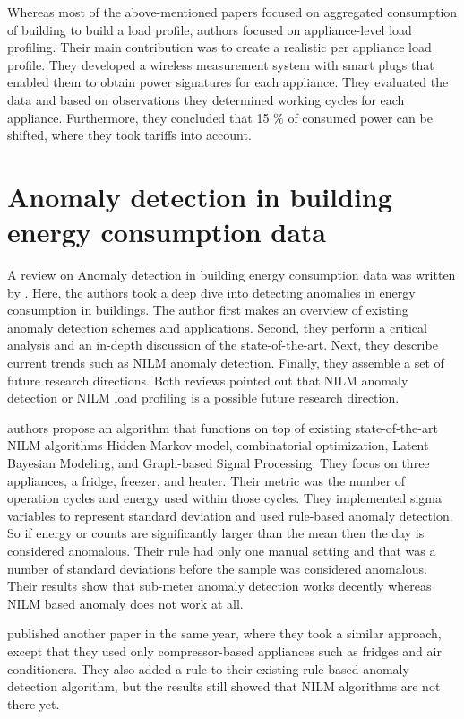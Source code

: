 Whereas most of the above-mentioned papers focused on aggregated consumption of building to build a load profile,
authors \cite{Issi2018} focused on appliance-level load profiling.
Their main contribution was to create a realistic per appliance load profile.
They developed a wireless measurement system with smart plugs that enabled them to obtain 
power signatures for each appliance. They evaluated the data and based on observations they determined working cycles for each appliance.
Furthermore, they concluded that 15 \% of consumed power can be shifted, where they took tariffs into account. 

\section{Anomaly detection in building energy consumption data}

A review on Anomaly detection in building energy consumption data was written by \cite{HIMEUR2021116601}.
Here, the authors took a deep dive into detecting anomalies in energy consumption in buildings. 
The author first makes an overview of existing anomaly detection schemes and applications.
Second, they perform a critical analysis and an in-depth discussion of the state-of-the-art.
Next, they describe current trends such as NILM anomaly detection. Finally, they assemble a set of future research directions. 
Both reviews pointed out that NILM anomaly detection or NILM load profiling is a possible future research direction.

\cite{NILMAD2019} authors propose an algorithm
that functions on top of existing state-of-the-art NILM algorithms Hidden Markov model,
combinatorial optimization, Latent Bayesian Modeling, and Graph-based Signal Processing.
They focus on three appliances, a fridge, freezer, and heater. Their metric was the number of operation cycles and energy used within those cycles. 
They implemented sigma variables to represent standard deviation and used rule-based anomaly detection.
So if energy or counts are significantly larger than the mean then the day is considered anomalous.
Their rule had only one manual setting and that was a number of standard deviations before the sample was considered anomalous.
Their results show that sub-meter anomaly detection works decently whereas NILM based anomaly does not work at all. 

\cite{NILMAD22019} published another paper in the same year, where they took a similar approach, except that they used 
only compressor-based appliances such as fridges and air conditioners. They also added a rule to their existing rule-based anomaly 
detection algorithm, but the results still showed that NILM algorithms are not there yet. 

